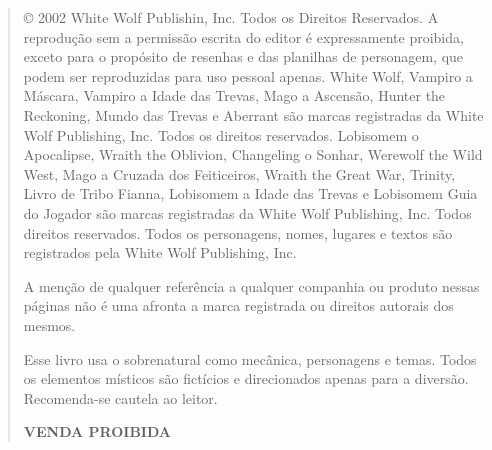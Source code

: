 \begin{quote}
© 2002 White Wolf Publishin, Inc. Todos os Direitos Reservados. A reprodução sem a permissão escrita do editor é expressamente proibida, exceto para o propósito de resenhas e das planilhas de personagem, que podem ser reproduzidas para uso pessoal apenas. White Wolf, Vampiro a Máscara, Vampiro a Idade das Trevas, Mago a Ascensão, Hunter the Reckoning, Mundo das Trevas e Aberrant são marcas registradas da White Wolf Publishing, Inc. Todos os direitos reservados. Lobisomem o Apocalipse, Wraith the Oblivion, Changeling o Sonhar, Werewolf the Wild West, Mago a Cruzada dos Feiticeiros, Wraith the Great War, Trinity, Livro de Tribo Fianna, Lobisomem a Idade das Trevas e Lobisomem Guia do Jogador são marcas registradas da White Wolf Publishing, Inc. Todos direitos reservados. Todos os personagens, nomes, lugares e textos são registrados pela White Wolf Publishing, Inc. 

A menção de qualquer referência a qualquer companhia ou produto nessas páginas não é uma afronta a marca registrada ou direitos autorais dos mesmos. 

Esse livro usa o sobrenatural como mecânica, personagens e temas. Todos os elementos místicos são fictícios e direcionados apenas para a diversão. Recomenda-se cautela ao leitor.

\begin{center}
{\bf VENDA PROIBIDA}
\end{center}
\end{quote}